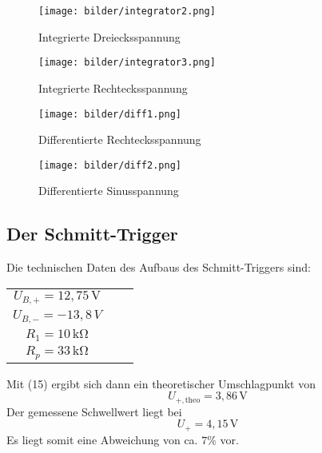\begin{figure}[h]
  \centering
  \texttt{[image: bilder/integrator2.png]}
  \caption{Integrierte Dreiecksspannung}
\end{figure}
\begin{figure}[h]
  \centering
  \texttt{[image: bilder/integrator3.png]}
  \caption{Integrierte Rechtecksspannung}
\end{figure}
\begin{figure}[h]
  \centering
  \texttt{[image: bilder/diff1.png]}
  \caption{Differentierte Rechtecksspannung}
\end{figure}
\begin{figure}[h]
  \centering
  \texttt{[image: bilder/diff2.png]}
  \caption{Differentierte Sinusspannung}%
\end{figure}
\subsection{Der Schmitt-Trigger}
Die technischen Daten des Aufbaus des Schmitt-Triggers sind:
\begin{table}[H]
\centering
\begin{tabular}{ccc}
$U_{B,+}=12{,}75 \,\si{\V}$ \\
$U_{B,-}=-13{,}8\,\si{V}$ \\
$R_1=10\,\si{\kilo\ohm}$ \\
$R_p=33\,\si{\kilo\ohm}$ \\
\end{tabular}
\end{table}
Mit (15) ergibt sich dann ein theoretischer Umschlagpunkt von
\begin{equation}
U_{+,\text{theo}}=3{,}86\,\si{\V}
\end{equation}
Der gemessene Schwellwert liegt bei
\begin{equation}
U_{+}=4{,}15\,\si{\V}
\end{equation}
Es liegt somit eine Abweichung von ca. $7\%$ vor.
